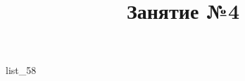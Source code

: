 \documentclass[12pt, a4paper]{article}
\begin{document}
	\title{Занятие №4}
	{list_58}
\end{document}
